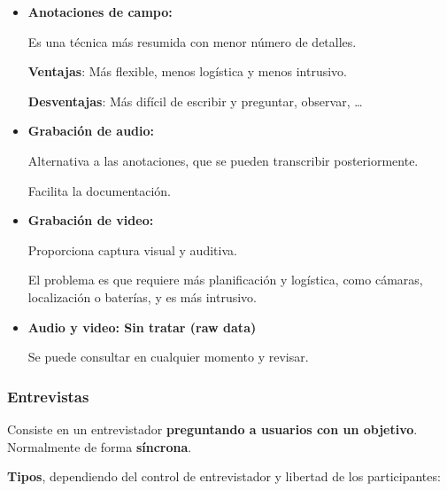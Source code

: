 \begin{itemize}
\item
  \textbf{Anotaciones de campo:}

  Es una técnica más resumida con menor número de detalles.

  \textbf{Ventajas}: Más flexible, menos logística y menos intrusivo.

  \textbf{Desventajas}: Más difícil de escribir y preguntar, observar,
  \ldots{}
\item
  \textbf{Grabación de audio:}

  Alternativa a las anotaciones, que se pueden transcribir
  posteriormente.

  Facilita la documentación.
\item
  \textbf{Grabación de video:}

  Proporciona captura visual y auditiva.

  El problema es que requiere más planificación y logística, como
  cámaras, localización o baterías, y es más intrusivo.
\item
  \textbf{Audio y video: Sin tratar (raw data)}

  Se puede consultar en cualquier momento y revisar.
\end{itemize}

\hypertarget{entrevistas}{%
\subsubsection{Entrevistas}\label{entrevistas}}

Consiste en un entrevistador \textbf{preguntando a usuarios con un
objetivo}. Normalmente de forma \textbf{síncrona}.

\textbf{Tipos}, dependiendo del control de entrevistador y libertad de
los participantes:

